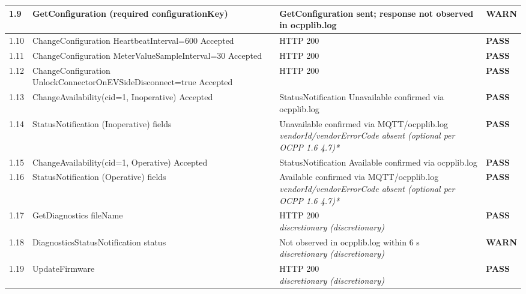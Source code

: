 \documentclass[10pt, a4paper]{article}
\begin{document}
\begin{longtable}{|L{1cm}|L{5.5cm}|M{7cm}|C{1.8cm}|}
\hline
\small 1.9 & \small GetConfiguration (required configurationKey) & GetConfiguration sent; response not observed in ocpplib.log & \textcolor{warnorange}{\textbf{WARN}} \\
\hline
\small 1.10 & \small ChangeConfiguration HeartbeatInterval=600  Accepted & HTTP 200 & \textcolor{passgreen}{\textbf{PASS}} \\
\hline
\small 1.11 & \small ChangeConfiguration MeterValueSampleInterval=30  Accepted & HTTP 200 & \textcolor{passgreen}{\textbf{PASS}} \\
\hline
\small 1.12 & \small ChangeConfiguration UnlockConnectorOnEVSideDisconnect=true  Accepted & HTTP 200 & \textcolor{passgreen}{\textbf{PASS}} \\
\hline
\small 1.13 & \small ChangeAvailability(cid=1, Inoperative)  Accepted & StatusNotification Unavailable confirmed via ocpplib.log & \textcolor{passgreen}{\textbf{PASS}} \\
\hline
\small 1.14 & \small StatusNotification (Inoperative) fields & Unavailable confirmed via MQTT/ocpplib.log{\newline\normalfont\footnotesize\itshape vendorId/vendorErrorCode absent (optional per OCPP 1.6 4.7)*} & \textcolor{passgreen}{\textbf{PASS}} \\
\hline
\small 1.15 & \small ChangeAvailability(cid=1, Operative)  Accepted & StatusNotification Available confirmed via ocpplib.log & \textcolor{passgreen}{\textbf{PASS}} \\
\hline
\small 1.16 & \small StatusNotification (Operative) fields & Available confirmed via MQTT/ocpplib.log{\newline\normalfont\footnotesize\itshape vendorId/vendorErrorCode absent (optional per OCPP 1.6 4.7)*} & \textcolor{passgreen}{\textbf{PASS}} \\
\hline
\small 1.17 & \small GetDiagnostics  fileName & HTTP 200{\newline\normalfont\footnotesize\itshape *discretionary (discretionary)} & \textcolor{passgreen}{\textbf{PASS}} \\
\hline
\small 1.18 & \small DiagnosticsStatusNotification  status & Not observed in ocpplib.log within 6 s{\newline\normalfont\footnotesize\itshape *discretionary (discretionary)} & \textcolor{warnorange}{\textbf{WARN}} \\
\hline
\small 1.19 & \small UpdateFirmware & HTTP 200{\newline\normalfont\footnotesize\itshape *discretionary (discretionary)} & \textcolor{passgreen}{\textbf{PASS}} \\

\end{longtable}
\end{document}

